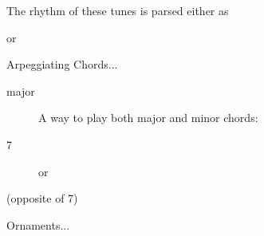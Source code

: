 \documentclass[landscape, 12pt]{article}
\begin{document}
\raggedcolumns %
\begin{multicols}{3}

The rhythm of these tunes is parsed either as\
\begin{center}
\end{center}
or
\begin{center}
\end{center}

Arpeggiating Chords...

\begin{description}

\item[major]
A way to play both major and minor chords:
\begin{center}
\end{center}

\item[7]
\begin{center}
\end{center}
or
\begin{center}
\end{center}

\item[(opposite of 7)]
\begin{center}
\end{center}
\end{description}

Ornaments...

\end{multicols}
\end{document}
